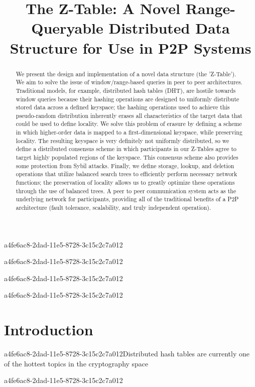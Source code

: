 \documentclass[12pt]{article}
\title{The Z-Table: A Novel Range-Queryable Distributed Data Structure for Use in P2P Systems}
\begin{document}
a4fe6ac8-2dad-11e5-8728-3c15c2c7a012\maketitle

a4fe6ac8-2dad-11e5-8728-3c15c2c7a012\begin{abstract}
We present the design and implementation of a novel data structure (the 'Z-Table'). We aim to solve the issue of window/range-based queries in peer to peer architectures. Traditional models, for example,  distributed hash tables (DHT), are hostile towards window queries because their hashing operations are designed to uniformly distribute stored data across a defined keyspace; the hashing operations used to achieve this pseudo-random distribution inherently erases all characteristics of the target data that could be used to define locality. We solve this problem of erasure by defining a scheme in which higher-order data is mapped to a first-dimensional keyspace, while preserving locality. The resulting keyspace is very definitely not uniformly distributed, so we define a distributed consensus scheme in which participants in our Z-Tables agree to target highly populated regions of the keyspace. This consensus scheme also provides some protection from Sybil attacks. Finally, we define storage, lookup, and deletion operations that utilize balanced search trees to efficiently perform necessary network functions; the preservation of locality allows us to greatly optimize these operations through the use of balanced trees. A peer to peer communication system acts as the underlying network for participants, providing all of the traditional benefits of a P2P architecture (fault tolerance, scalability, and truly independent operation).
\end{abstract}
a4fe6ac8-2dad-11e5-8728-3c15c2c7a012

a4fe6ac8-2dad-11e5-8728-3c15c2c7a012\newpage
\section{Introduction}
a4fe6ac8-2dad-11e5-8728-3c15c2c7a012Distributed hash tables are currently one of the hottest topics in the cryptography space~\cite{Stoica:2001dj,Rowstron:2001ea,Ratnasamy:2001wn}

a4fe6ac8-2dad-11e5-8728-3c15c2c7a012\printbibliography
\end{document}
